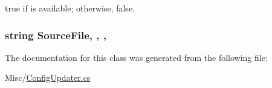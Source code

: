 {\ttfamily true} if is available; otherwise, {\ttfamily false}.\hypertarget{classOTA_1_1ConfigUpdater_a0b6a7aa2ed188dc7820c804906dd8ead}{}
\subsubsection[{Source\+File}]{\setlength{\rightskip}{0pt plus 5cm}string Source\+File\hspace{0.3cm}{\ttfamily [static]}, {\ttfamily [get]}, {\ttfamily [set]}, {\ttfamily [package]}}\label{classOTA_1_1ConfigUpdater_a0b6a7aa2ed188dc7820c804906dd8ead}


The documentation for this class was generated from the following file\+:\begin{DoxyCompactItemize}
\item 
Misc/\hyperlink{ConfigUpdater_8cs}{Config\+Updater.\+cs}\end{DoxyCompactItemize}
